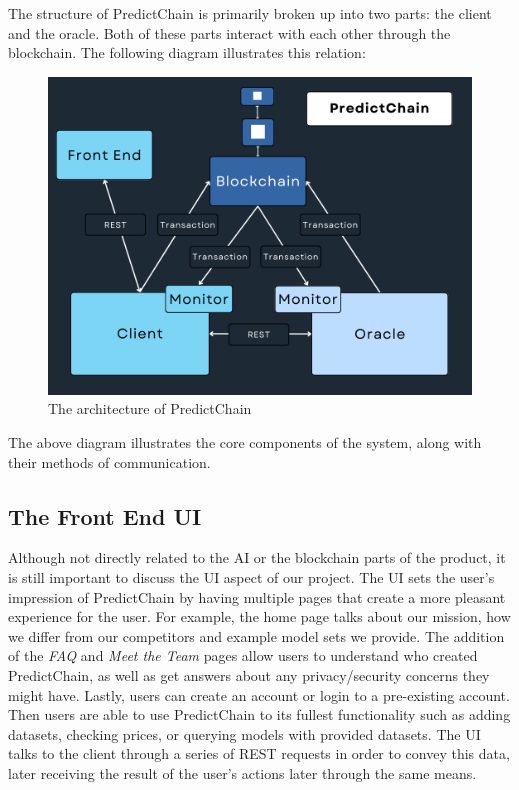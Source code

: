 \documentclass{article}
\begin{document}
    The structure of PredictChain is primarily broken up into two parts: the client and the oracle.  Both of these parts
    interact with each other through the blockchain.  The following diagram illustrates this relation:

    \begin{figure}[H]
        \begin{center}
            \begin{minipage}{0.6\textwidth}
            \centering
            \includegraphics[width=\linewidth]{../../img/detailedDiagram}
            \caption{The architecture of PredictChain}\label{Fig:detailedDiagram}
        \end{minipage}\hfill
        \end{center}
    \end{figure}

    The above diagram illustrates the core components of the system, along with their methods of communication.

    \subsection{The Front End UI}
    Although not directly related to the AI or the blockchain parts of the product, it is still important to discuss the
    UI aspect of our project. The UI sets the user's impression of PredictChain by having multiple pages that create a more
    pleasant experience for the user. For example, the home page talks about our mission, how we differ from our
    competitors and example model sets we provide. The addition of the \textit{FAQ} and \textit{Meet the Team} pages allow users to
    understand who created PredictChain, as well as get answers about any privacy/security concerns they might have.
    Lastly, users can create an account or login to a pre-existing account. Then users are able to use PredictChain
    to its fullest functionality such as adding datasets, checking prices, or querying models with provided datasets.
    The UI talks to the client through a series of REST requests in order to convey this data, later receiving the
    result of the user's actions later through the same means.
\end{document}
